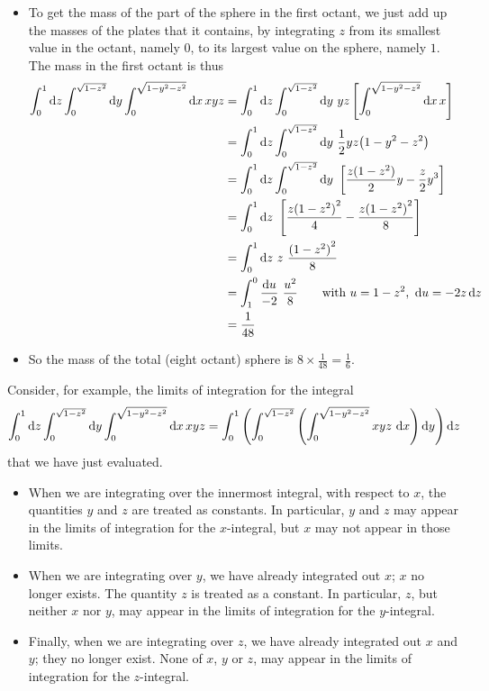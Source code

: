 \begin{eg}
\begin{itemize}
\item
To get the mass of the part of the sphere in the first octant, we just 
add up the masses of the plates that it contains, by integrating $z$ from its smallest value in the octant, namely $0$, to its largest value on the sphere, 
namely  $1$. The mass in the first octant is thus
\begin{align*}
\int_0^1\dee{z}\int_0^{\sqrt{1-z^2}}\dee{y}\int_0^{\sqrt{1-y^2-z^2}}  \dee{x}\,xyz
&= \int_0^1\dee{z}\int_0^{\sqrt{1-z^2}}\dee{y}\ yz
          \left[\int_0^{\sqrt{1-y^2-z^2}}  \dee{x}\,x\right] \\
&= \int_0^1\dee{z}\int_0^{\sqrt{1-z^2}}\dee{y}\ 
              \frac{1}{2}yz \big(1-y^2-z^2\big) \\
&=\int_0^1\dee{z}\int_0^{\sqrt{1-z^2}}\dee{y}\ 
                      \left[\frac{z(1-z^2)}{2}y-\frac{z}{2}y^3\right] \\
&=\int_0^1\dee{z}\ \left[\frac{z{(1-z^2)}^2}{4}-\frac{z{(1-z^2)}^2}{8}\right] \\
&=\int_0^1\dee{z}\ z\ \frac{{(1-z^2)}^2}{8} \\
&=\int_1^0\frac{\dee{u}}{-2}\ \frac{u^2}{8}
           \qquad\text{with }u=1-z^2,\ \dee{u}=-2z\,\dee{z} \\
&=\frac{1}{48}
\end{align*}
\item
So the mass of the total (eight octant) sphere is $8\times\frac{1}{48}=\frac{1}{6}$.
\end{itemize}

\end{eg}

Consider, for example, the limits of integration for the integral
\begin{align*}
\int_0^1\dee{z}\int_0^{\sqrt{1-z^2}}\dee{y}\int_0^{\sqrt{1-y^2-z^2}}  \dee{x}\,xyz
=\int_0^1\left(\int_0^{\sqrt{1-z^2}}\left(\int_0^{\sqrt{1-y^2-z^2}}  xyz\ \dee{x}\right)\dee{y} \right)\dee{z}
\end{align*}
that we have just evaluated.
\begin{itemize}
\item
When we are integrating over the innermost integral, with respect to $x$,
the quantities $y$ and $z$ are treated as constants. In particular,
$y$ and $z$ may appear in the limits of integration for the $x$-integral,
but $x$ may not appear in those limits.
\item
When we are integrating over $y$, we have already integrated out $x$;
$x$ no longer exists. The quantity $z$ is treated as a constant. In particular,
$z$, but neither $x$ nor $y$, may appear in the limits of integration for the $y$-integral.
\item
Finally, when we are integrating over $z$, we have already integrated out 
$x$ and $y$; they no longer exist. None of $x$, $y$ or $z$, may appear in the limits of integration for the $z$-integral.

\end{itemize}

